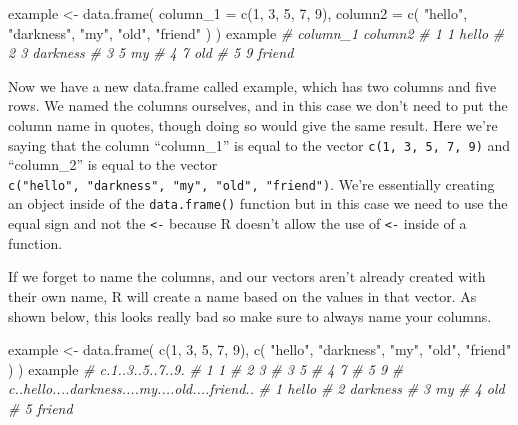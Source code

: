 \documentclass[
]{krantz}
\makeatletter
\newenvironment{Shaded}{\begin{snugshade}}{\end{snugshade}}
\newcommand{\AttributeTok}[1]{\textcolor[rgb]{0.61,0.61,0.61}{#1}}
\newcommand{\CommentTok}[1]{\textcolor[rgb]{0.37,0.37,0.37}{\textit{#1}}}
\newcommand{\DecValTok}[1]{\textcolor[rgb]{0.06,0.06,0.06}{#1}}
\newcommand{\FunctionTok}[1]{\textcolor[rgb]{0,0,0}{#1}}
\newcommand{\NormalTok}[1]{#1}
\newcommand{\OtherTok}[1]{\textcolor[rgb]{0.37,0.37,0.37}{#1}}
\newcommand{\StringTok}[1]{\textcolor[rgb]{0.5,0.5,0.5}{#1}}
\newenvironment{kframe}{%
\medskip{}
\setlength{\fboxsep}{.8em}
 \def\at@end@of@kframe{}%
 \ifinner\ifhmode%
  \def\at@end@of@kframe{\end{minipage}}%
  \begin{minipage}{\columnwidth}%
 \fi\fi%
 \def\FrameCommand##1{\hskip\@totalleftmargin \hskip-\fboxsep
 \colorbox{shadecolor}{##1}\hskip-\fboxsep
     \hskip-\linewidth \hskip-\@totalleftmargin \hskip\columnwidth}%
 \MakeFramed {\advance\hsize-\width
   \@totalleftmargin\z@ \linewidth\hsize
   \@setminipage}}%
 {\par\unskip\endMakeFramed%
 \at@end@of@kframe}
\renewenvironment{Shaded}{\begin{kframe}}{\end{kframe}}
\makeatother
\begin{document}
\begin{Shaded}
\begin{Highlighting}[]
\NormalTok{example }\OtherTok{\textless{}{-}} \FunctionTok{data.frame}\NormalTok{(}
  \AttributeTok{column\_1 =} \FunctionTok{c}\NormalTok{(}\DecValTok{1}\NormalTok{, }\DecValTok{3}\NormalTok{, }\DecValTok{5}\NormalTok{, }\DecValTok{7}\NormalTok{, }\DecValTok{9}\NormalTok{),}
  \AttributeTok{column2 =} \FunctionTok{c}\NormalTok{(}
    \StringTok{"hello"}\NormalTok{,}
    \StringTok{"darkness"}\NormalTok{,}
    \StringTok{"my"}\NormalTok{,}
    \StringTok{"old"}\NormalTok{,}
    \StringTok{"friend"}
\NormalTok{  )}
\NormalTok{)}
\NormalTok{example}
\CommentTok{\#   column\_1  column2}
\CommentTok{\# 1        1    hello}
\CommentTok{\# 2        3 darkness}
\CommentTok{\# 3        5       my}
\CommentTok{\# 4        7      old}
\CommentTok{\# 5        9   friend}
\end{Highlighting}
\end{Shaded}

Now we have a new data.frame called example, which has two
columns and five rows. We named the columns ourselves, and
in this case we don't need to put the column name in quotes,
though doing so would give the same result. Here we're
saying that the column ``column\_1'' is equal to the vector
\texttt{c(1,\ 3,\ 5,\ 7,\ 9)} and ``column\_2'' is equal to
the vector
\texttt{c("hello",\ "darkness",\ "my",\ "old",\ "friend")}.
We're essentially creating an object inside of the
\texttt{data.frame()} function but in this case we need to
use the equal sign and not the \texttt{\textless{}-} because
R doesn't allow the use of \texttt{\textless{}-} inside of a
function.

If we forget to name the columns, and our vectors aren't
already created with their own name, R will create a name
based on the values in that vector. As shown below, this
looks really bad so make sure to always name your columns.

\begin{Shaded}
\begin{Highlighting}[]
\NormalTok{example }\OtherTok{\textless{}{-}} \FunctionTok{data.frame}\NormalTok{(}
  \FunctionTok{c}\NormalTok{(}\DecValTok{1}\NormalTok{, }\DecValTok{3}\NormalTok{, }\DecValTok{5}\NormalTok{, }\DecValTok{7}\NormalTok{, }\DecValTok{9}\NormalTok{),}
  \FunctionTok{c}\NormalTok{(}
    \StringTok{"hello"}\NormalTok{,}
    \StringTok{"darkness"}\NormalTok{,}
    \StringTok{"my"}\NormalTok{,}
    \StringTok{"old"}\NormalTok{,}
    \StringTok{"friend"}
\NormalTok{  )}
\NormalTok{)}
\NormalTok{example}
\CommentTok{\#   c.1..3..5..7..9.}
\CommentTok{\# 1                1}
\CommentTok{\# 2                3}
\CommentTok{\# 3                5}
\CommentTok{\# 4                7}
\CommentTok{\# 5                9}
\CommentTok{\#   c..hello....darkness....my....old....friend..}
\CommentTok{\# 1                                         hello}
\CommentTok{\# 2                                      darkness}
\CommentTok{\# 3                                            my}
\CommentTok{\# 4                                           old}
\CommentTok{\# 5                                        friend}
\end{Highlighting}
\end{Shaded}
\end{document}
